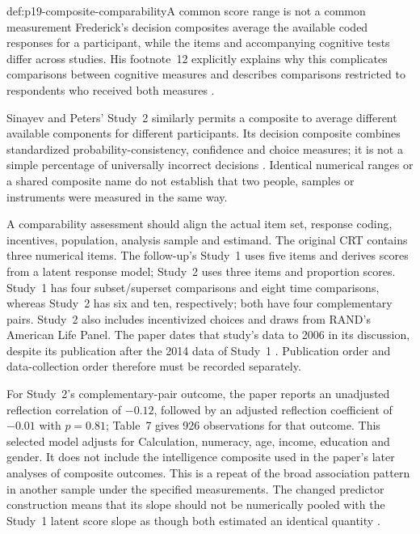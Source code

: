 \begin{hbwarning}{def:p19-composite-comparability}{A common score range is not a common measurement}
Frederick's decision composites average the available coded responses for a
participant, while the items and accompanying cognitive tests differ across
studies. His footnote~12 explicitly explains why this complicates comparisons
between cognitive measures and describes comparisons restricted to respondents
who received both measures \cite[p.~36]{Frederick2005CRT}.

Sinayev and Peters' Study~2 similarly permits a composite to average different
available components for different participants. Its decision composite combines
standardized probability-consistency, confidence and choice measures; it is not
a simple percentage of universally incorrect decisions
\cite[pp.~8--10]{SinayevPeters2015Calculation}.
Identical numerical ranges or a shared composite name do not establish that
two people, samples or instruments were measured in the same way.
\end{hbwarning}

A comparability assessment should align the actual item set, response coding,
incentives, population, analysis sample and estimand. The original CRT contains
three numerical items. The follow-up's Study~1 uses five items and derives
scores from a latent response model; Study~2 uses three items and proportion
scores. Study~1 has four subset/superset comparisons and eight time comparisons,
whereas Study~2 has six and ten, respectively; both have four complementary
pairs. Study~2 also includes incentivized choices and draws from RAND's American
Life Panel. The paper dates that study's data to 2006 in its discussion, despite
its publication after the 2014 data of Study~1
\cite[pp.~4, 8--10, 13]{SinayevPeters2015Calculation}.
Publication order and data-collection order therefore must be recorded separately.

For Study~2's complementary-pair outcome, the paper reports an unadjusted
reflection correlation of \(-0.12\), followed by an adjusted reflection
coefficient of \(-0.01\) with \(p=0.81\); Table~7 gives 926 observations for
that outcome. This selected model adjusts for Calculation, numeracy, age,
income, education and gender. It does not include the intelligence composite
used in the paper's later analyses of composite outcomes. This is a repeat of
the broad association pattern in another
sample under the specified measurements. The changed predictor construction
means that its slope should not be numerically pooled with the Study~1 latent
score slope as though both estimated an identical quantity
\cite[pp.~10--11]{SinayevPeters2015Calculation}.

